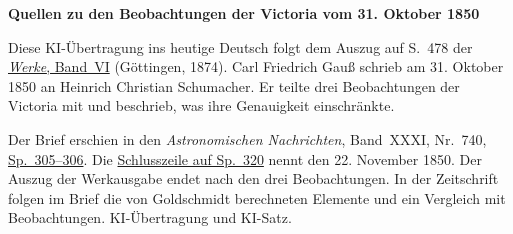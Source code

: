 \clearpage\thispagestyle{empty}
\begin{center}\textbf{Quellen zu den Beobachtungen der Victoria vom 31. Oktober 1850}\end{center}
\noindent Diese KI-Übertragung ins heutige Deutsch folgt dem Auszug auf S.~478 der \href{https://gdz.sub.uni-goettingen.de/id/PPN236007467}{\textit{Werke}, Band~VI} (Göttingen, 1874). Carl Friedrich Gauß schrieb am 31. Oktober 1850 an Heinrich Christian Schumacher. Er teilte drei Beobachtungen der Victoria mit und beschrieb, was ihre Genauigkeit einschränkte.
\par\smallskip\noindent Der Brief erschien in den \textit{Astronomischen Nachrichten}, Band~XXXI, Nr.~740, \href{https://api.digitale-sammlungen.de/iiif/image/v2/bsb10049456_00157/full/1800,/0/default.jpg}{Sp.~305--306}. Die \href{https://api.digitale-sammlungen.de/iiif/image/v2/bsb10049456_00164/full/1800,/0/default.jpg}{Schlusszeile auf Sp.~320} nennt den 22. November 1850. Der Auszug der Werkausgabe endet nach den drei Beobachtungen. In der Zeitschrift folgen im Brief die von Goldschmidt berechneten Elemente und ein Vergleich mit Beobachtungen. KI-Übertragung und KI-Satz.
\clearpage
